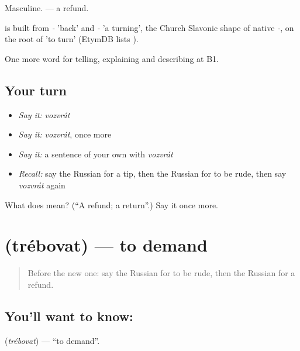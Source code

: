 Masculine. \emph{ } — a refund.

\begin{cousinweb}
\emph{} is built from \emph{-} 'back' and \emph{-} 'a turning', the Church Slavonic shape of native \emph{-}, on the root of \emph{} 'to turn' (EtymDB lists \emph{}).
\end{cousinweb}

\begin{grammarlens}[title={What you've built}]
One more word for telling, explaining and describing at B1.
\end{grammarlens}

\subsection*{Your turn}
\begin{itemize}
\raggedright
  \item \emph{Say it:} \emph{vozvrát}
  \item \emph{Say it:} \emph{vozvrát}, once more
  \item \emph{Say it:} a sentence of your own with \emph{vozvrát}
  \item \emph{Recall:} say the Russian for a tip, then the Russian for to be rude, then say \emph{vozvrát} again
\end{itemize}

\begin{tcolorbox}[breakable,colback=teal!4,colframe=teal!35!black,title={Before you move on}]
What does  mean? (\textquotedblleft{}A refund; a return\textquotedblright{}.) Say it once more.
\end{tcolorbox}
\section[\texorpdfstring{\ru{требовать} (trébovat)}{требовать (trébovat)}]{ (trébovat) — to demand}

\label{lesson:RU-C436-trebovat}



\begin{quote}
Before the new one: say the Russian for to be rude, then the Russian for a refund.
\end{quote}

\subsection*{You'll want to know: }
\textbf{} (\emph{trébovat}) — \textquotedblleft{}to demand\textquotedblright{}.

